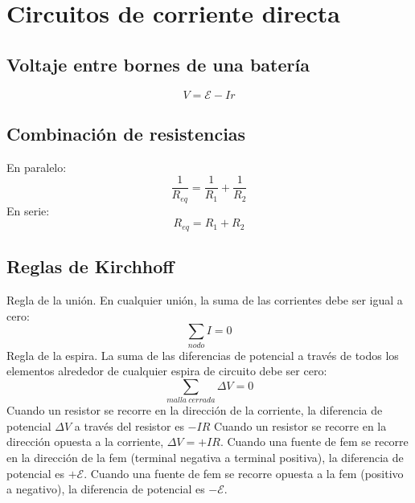 \documentclass{report}
\begin{document}
  \section*{Circuitos de corriente directa}

    \subsection*{Voltaje entre bornes de una batería}

      \begin{equation*}
        V=\mathcal{E}-Ir
      \end{equation*}

    \subsection*{Combinación de resistencias}
      
      En paralelo:\\
      \begin{equation*}
        \frac{1}{R_{eq}}=\frac{1}{R_1}+\frac{1}{R_2}
      \end{equation*}
      \indent En serie:
      \begin{equation*}
        R_{eq}=R_1+R_2
      \end{equation*}

    \subsection*{Reglas de Kirchhoff}

      Regla de la unión. En cualquier unión, la suma de las corrientes debe ser 
      igual a cero:
      \begin{equation*}
        \sum_{nodo}I=0
      \end{equation*}
      \indent Regla de la espira. La suma de las diferencias de potencial a través 
      de todos los elementos alrededor de cualquier espira de circuito debe ser cero:
      \begin{equation*}
        \sum_{malla \ cerrada}\Delta V=0
      \end{equation*}
      Cuando un resistor se recorre en la dirección de la corriente, la diferencia 
      de potencial $\Delta V$ a través del resistor es $-IR$ Cuando un resistor se
      recorre en la dirección opuesta a la corriente, $\Delta V=+IR$. Cuando una
      fuente de fem se recorre en la dirección de la fem (terminal negativa a
      terminal positiva), la diferencia de potencial es $+\mathcal{E}$. Cuando una fuente
      de fem se recorre opuesta a la fem (positivo a negativo), la diferencia de
      potencial es $-\mathcal{E}$.
\end{document}
